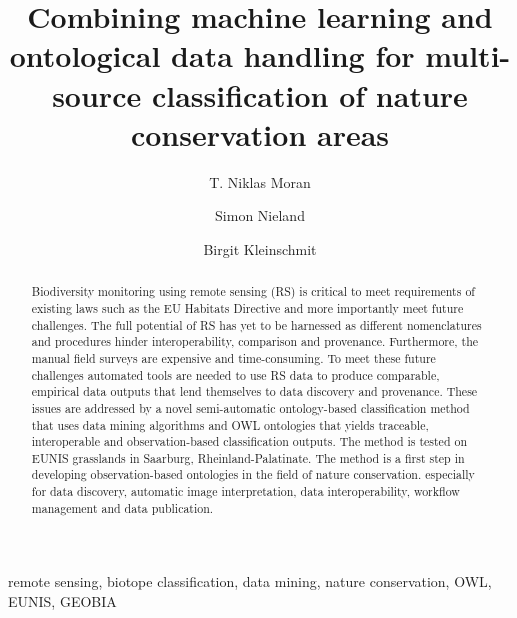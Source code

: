 \documentclass[authoryear,review,12pt,number]{elsarticle}
\begin{document}
%
\begin{frontmatter}
\title{Combining machine learning and ontological data handling for multi-source
classification of nature conservation areas}

\author[TUB]{T. Niklas Moran}

\author[TUB]{Simon Nieland}
\author[TUB]{Birgit Kleinschmit}

\address[TUB]{Geoinformation in Environmental Planning Lab, Technische
Universit\"at Berlin, Stra\ss e des 17. Juni 145, 10623 Berlin, Germany}


\begin{abstract}
Biodiversity monitoring using remote sensing (RS) is critical to meet 
requirements of existing laws such as the EU Habitats Directive and more 
importantly meet future challenges. The full potential of RS has yet to be 
harnessed as different nomenclatures and procedures hinder interoperability, 
comparison and provenance. Furthermore, the manual field surveys are expensive 
and time-consuming. To meet these future challenges automated tools are needed 
to use RS data to produce comparable, empirical data outputs that lend 
themselves to data discovery and provenance. These issues are addressed by a 
novel semi-automatic ontology-based classification method that uses data mining 
algorithms and OWL ontologies that yields traceable, interoperable and 
observation-based classification outputs. The method is tested on EUNIS 
grasslands in Saarburg, Rheinland-Palatinate. The method is a first step in 
developing observation-based ontologies in the field of nature conservation. 
especially for data discovery, automatic image interpretation, data 
interoperability, workflow management and data publication.
\end{abstract}

\begin{keyword}
remote sensing, biotope classification, data mining, nature conservation, OWL, 
EUNIS, GEOBIA 
\end{keyword}
\end{frontmatter}
\end{document}
